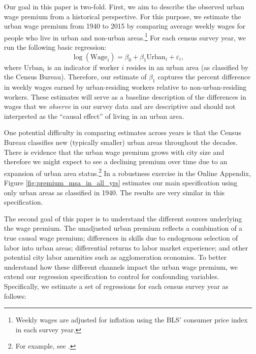\documentclass[12pt,twoside]{article}
\begin{document}
Our goal in this paper is two-fold. 
First, we aim to describe the observed urban wage premium from a historical perspective.
For this purpose, we estimate the urban wage premium from 1940 to 2015 by comparing average weekly wages for people who live in urban and non-urban areas.\footnote{Weekly wages are adjusted for inflation using the BLS' consumer price index in each survey year.} 
For each census survey year, we run the following basic regression:
\begin{equation}
    \label{eq:reg}
    \log(\text{Wage}_i) = \beta_0 + \beta_1 \text{Urban}_i + \varepsilon_i,
\end{equation}
where $\text{Urban}_i$ is an indicator if worker $i$ resides in an urban area (as classified by the Census Bureau).
Therefore, our estimate of $\beta_1$ captures the percent difference in weekly wages earned by urban-residing workers relative to non-urban-residing workers. 
These estimates will serve as a baseline description of the differences in wages that we \emph{observe} in our survey data and are descriptive and should not interpreted as the ``causal effect'' of living in an urban area.

One potential difficulty in comparing estimates across years is that the Census Bureau classifies new (typically smaller) urban areas throughout the decades. 
There is evidence that the urban wage premium grows with city size and therefore we might expect to see a declining premium over time due to an expansion of urban area status.\footnote{For example, see \citet{Glaeser_Mare_2001}.} 
In a robustness exercise in the Online Appendix, Figure \ref{fig:premium_msa_in_all_yrs} estimates our main specification using only urban areas as classified in 1940. 
The results are very similar in this specification. 

The second goal of this paper is to understand the different sources underlying the wage premium. 
The unadjusted urban premium reflects a combination of a true causal wage premium; differences in skills due to endogenous selection of labor into urban areas; differential returns to labor market experience; and other potential city labor amenities such as agglomeration economies. 
To better understand how these different channels impact the urban wage premium, we extend our regression specification to control for confounding variables. 
Specifically, we estimate a set of regressions for each census survey year as follows: 
\end{document}
